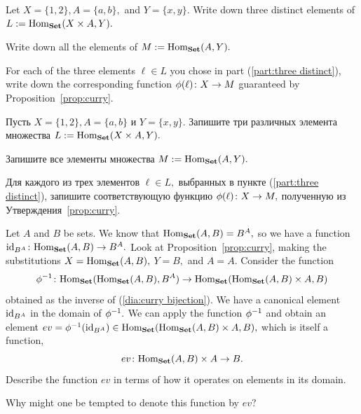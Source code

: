 \documentclass[CT4S-EN-RU]{subfiles}
\begin{document}
\begin{exerciseENG}
Let $X=\{1,2\}, A=\{a,b\},$ and $Y=\{x,y\}.$ 
\sexc\label{part:three distinct} Write down three distinct elements of $L:=\textnormal{Hom}_{\mathbf{Set}}(X\times A,Y).$ 
\item Write down all the elements of $M:=\textnormal{Hom}_{\mathbf{Set}}(A,Y).$ 
\item For each of the three elements $\ell\in L$ you chose in part (\ref{part:three distinct}), write down the corresponding function $\phi(\ell)\colon X\rightarrow M$ guaranteed by Proposition~\ref{prop:curry}.
\endsexc
\end{exerciseENG}

\begin{exerciseRUS}
Пусть $X=\{1,2\}, A=\{a,b\}$ и $Y=\{x,y\}.$ 
\sexc\label{part:three distinct} Запишите три различных элемента множества $L:=\textnormal{Hom}_{\mathbf{Set}}(X\times A,Y).$ 
\item Запишите все элементы множества $M:=\textnormal{Hom}_{\mathbf{Set}}(A,Y).$ 
\item Для каждого из трех элементов $\ell\in L,$ выбранных в пункте (\ref{part:three distinct}), запишите соответствующую функцию $\phi(\ell)\colon X\rightarrow M,$ полученную из Утверждения~\ref{prop:curry}.
\endsexc
\end{exerciseRUS}

\begin{exerciseENG}\label{exc:evaluation}
Let $A$ and $B$ be sets. We know that $\textnormal{Hom}_{\mathbf{Set}}(A,B)=B^A,$ so we have a function $\textnormal{id}_{B^A}\colon\textnormal{Hom}_{\mathbf{Set}}(A,B)\rightarrow B^A.$ Look at Proposition~\ref{prop:curry}, making the substitutions $X=\textnormal{Hom}_{\mathbf{Set}}(A,B),$ $Y=B,$ and  $A=A.$ Consider the function $$\phi^\m1\taking\Hom_\Set(\Hom_\Set(A,B),B^A)\to\Hom_\Set(\Hom_\Set(A,B)\times A,B)$$ obtained as the inverse of (\ref{dia:curry bijection}). We have a canonical element $\textnormal{id}_{B^A}$ in the domain of $\phi^\m1.$ We can apply the function $\phi^\m1$ and obtain an element $ev=\phi^\m1(\id_{B^A})\in\Hom_\Set(\Hom_\Set(A,B)\times A,B),$ which is itself a function, $$ev\colon\textnormal{Hom}_{\mathbf{Set}}(A,B)\times A\rightarrow B.$$ 
\sexc Describe the function $ev$ in terms of how it operates on elements in its domain. 
\item Why might one be tempted to denote this function by $ev?$
\endsexc
\end{exerciseENG}
\end{document}
